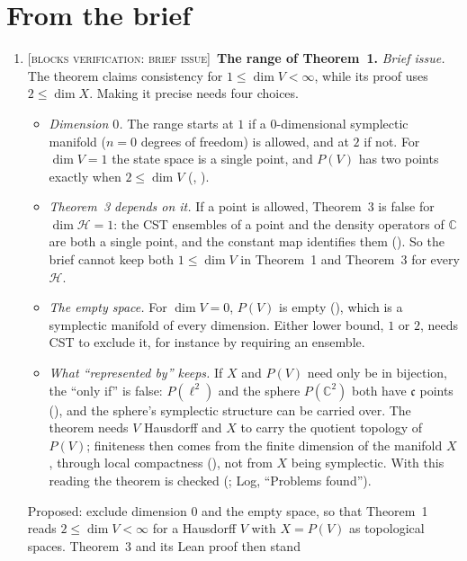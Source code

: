 \documentclass[11pt]{article}
\newcommand{\blocker}[1]{\textsc{[blocks verification: #1]}~}
\begin{document}
\section*{From the brief}
\begin{enumerate}
\item \blocker{brief issue}\textbf{The range of Theorem~1.} \emph{Brief issue.} The theorem claims consistency for
  $1 \le \dim V < \infty$, while its proof uses $2 \le \dim X$. Making it precise needs four
  choices.
  \begin{itemize}
  \item \emph{Dimension $0$.} The range starts at $1$ if a $0$-dimensional symplectic manifold
    ($n = 0$ degrees of freedom) is allowed, and at $2$ if not. For $\dim V = 1$ the state space
    is a single point, and $P(V)$ has two points exactly when $2 \le \dim V$
    (, ).
  \item \emph{Theorem~3 depends on it.} If a point is allowed, Theorem~3 is false for
    $\dim\mathcal H = 1$: the CST ensembles of a point and the density operators of
    $\mathbb C$ are both a single point, and the constant map identifies them
    (). So the brief cannot keep both
    $1 \le \dim V$ in Theorem~1 and Theorem~3 for every $\mathcal H$.
  \item \emph{The empty space.} For $\dim V = 0$, $P(V)$ is empty
    (), which is a symplectic manifold of every dimension. Either
    lower bound, $1$ or $2$, needs CST to exclude it, for instance by requiring an ensemble.
  \item \emph{What ``represented by'' keeps.} If $X$ and $P(V)$ need only be in bijection, the
    ``only if'' is false: $P(\ell^2)$ and the sphere $P(\mathbb C^2)$ both have $\mathfrak c$
    points (), and the sphere's symplectic structure can be
    carried over. The theorem needs $V$ Hausdorff and $X$ to carry the quotient topology of
    $P(V)$; finiteness then comes from the finite dimension of the manifold $X$, through local
    compactness (), not from $X$ being symplectic. With
    this reading the theorem is checked (; Log, ``Problems found'').
  \end{itemize}
  Proposed: exclude dimension $0$ and the empty space, so that Theorem~1 reads
  $2 \le \dim V < \infty$ for a Hausdorff $V$ with $X = P(V)$ as topological spaces. Theorem~3 and its Lean proof then stand

\end{enumerate}
\end{document}
